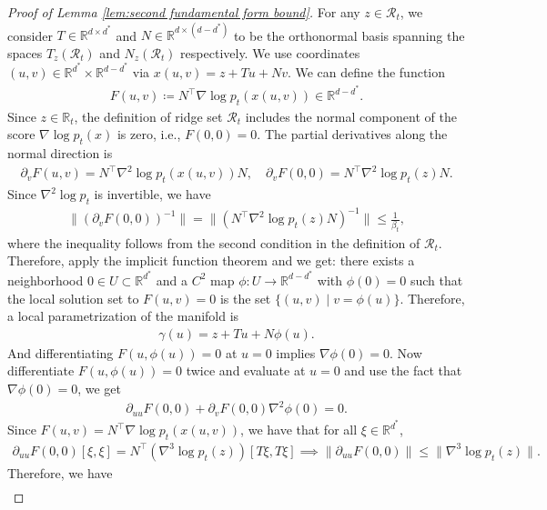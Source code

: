 \documentclass[11pt]{article}
\newcommand{\mb}{\mathbb}
\newcommand{\mc}{\mathcal}
\begin{document}
\begin{proof}[Proof of Lemma \ref{lem:second fundamental form bound}] For any $z\in \mc{R}_t$, we consider $T\in \mb{R}^{d\times d^*}$ and $N\in \mb{R}^{d\times (d-d^*)}$ to be the orthonormal basis spanning the spaces $T_z(\mc{R}_t)$ and $N_z(\mc{R}_t)$ respectively. We use coordinates $(u,v)\in \mb{R}^{d^*}\times \mb{R}^{d-d^*}$ via $x(u,v)=z+Tu+Nv$. We can define the function 
\begin{align*}
    F(u,v) \coloneqq N^\intercal \nabla \log p_t( x(u,v) ) \in \mb{R}^{d-d^*}.
\end{align*}
Since $z\in \mb{R}_t$, the definition of ridge set $\mc{R}_t$ includes the normal component of the score $\nabla\log p_t(x)$ is zero, i.e., $F(0,0)=0$. The partial derivatives along the normal direction is
\begin{align*}
    \partial_v F(u,v) = N^\intercal \nabla^2\log p_t(x(u,v)) N,\quad \partial_v F(0,0) = N^\intercal \nabla^2\log p_t(z) N.
\end{align*}
Since $\nabla^2\log p_t$ is invertible, we have
\begin{align*}
    \| (\partial_v F(0,0) )^{-1}\| = \| (N^\intercal \nabla^2\log p_t(z) N)^{-1} \| \le \frac{1}{\beta_t},
\end{align*}
where the inequality follows from the second condition in the definition of $\mc{R}_t$. Therefore, apply the implicit function theorem and we get: there exists a neighborhood $0\in U\subset \mb{R}^{d^*}$ and a $C^2$ map $\phi: U\to \mb{R}^{d-d^*}$ with $\phi(0)=0$ such that the local solution set to $F(u,v)=0$ is the set $\{(u,v) \mid v=\phi(u)\}$. Therefore, a local parametrization of the manifold is
\begin{align*}
    \gamma(u) = z + Tu + N\phi(u).
\end{align*}
And differentiating $F(u,\phi(u))=0$ at $u=0$ implies $\nabla \phi(0)=0$. Now differentiate $F(u,\phi(u))=0$ twice and evaluate at $u=0$ and use the fact that $\nabla\phi(0)=0$, we get
\begin{align*}
    \partial_{uu}F(0,0) + \partial_v F(0,0) \nabla^2\phi(0) =0 .
\end{align*}
Since $F(u,v)=N^\intercal \nabla \log p_t( x(u,v) )$, we have that for all $\xi\in \mb{R}^{d^*}$,
\begin{align*}
    \partial_{uu}F(0,0)[\xi,\xi] = N^\intercal (\nabla^3\log p_t(z))[T\xi, T\xi] \implies \|\partial_{uu} F(0,0) \|\le \| \nabla^3\log p_t(z) \|.
\end{align*}
Therefore, we have
\begin{align*}

\end{align*}
\end{proof}
\end{document}
